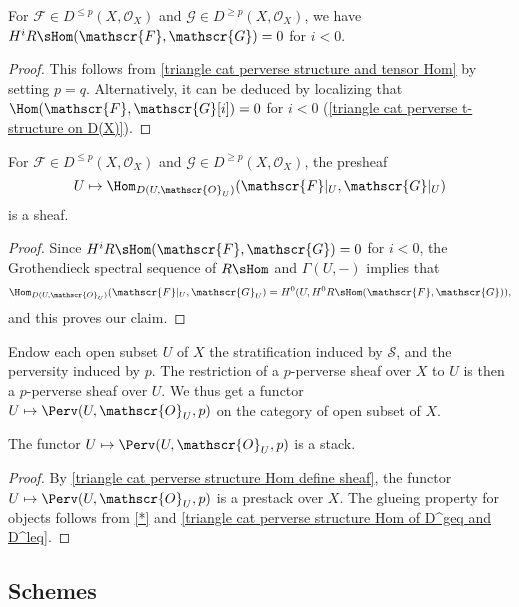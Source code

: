 \begin{corollary}\label{triangle cat perverse structure Hom of D^geq and D^leq}
For $\mathscr{F}\in D^{\leq p}(X,\mathscr{O}_X)$ and $\mathscr{G}\in D^{\geq p}(X,\mathscr{O}_X)$, we have $H^iR\sHom(\mathscr{F},\mathscr{G})=0$ for $i<0$.
\end{corollary}
\begin{proof}
This follows from \cref{triangle cat perverse structure and tensor Hom} by setting $p=q$. Alternatively, it can be deduced by localizing that $\Hom(\mathscr{F},\mathscr{G}[i])=0$ for $i<0$ (\cref{triangle cat perverse t-structure on D(X)}).
\end{proof}

\begin{corollary}\label{triangle cat perverse structure Hom define sheaf}
For $\mathscr{F}\in D^{\leq p}(X,\mathscr{O}_X)$ and $\mathscr{G}\in D^{\geq p}(X,\mathscr{O}_X)$, the presheaf
\[U\mapsto\Hom_{D(U,\mathscr{O}_U)}(\mathscr{F}|_U,\mathscr{G}|_U)\]
is a sheaf.
\end{corollary}
\begin{proof}
Since $H^iR\sHom(\mathscr{F},\mathscr{G})=0$ for $i<0$, the Grothendieck spectral sequence of $R\sHom$ and $\Gamma(U,-)$ implies that
\[\Hom_{D(U,\mathscr{O}_U)}(\mathscr{F}|_U,\mathscr{G}_U)=H^0(U,H^0R\sHom(\mathscr{F},\mathscr{G})),\]
and this proves our claim.
\end{proof}

Endow each open subset $U$ of $X$ the stratification induced by $\mathcal{S}$, and the perversity induced by $p$. The restriction of a $p$-perverse sheaf over $X$ to $U$ is then a $p$-perverse sheaf over $U$. We thus get a functor $U\mapsto\Perv(U,\mathscr{O}_U,p)$ on the category of open subset of $X$.
\begin{corollary}\label{triangle cat perverse sheaf is stack}
The functor $U\mapsto\Perv(U,\mathscr{O}_U,p)$ is a stack.
\end{corollary}
\begin{proof}
By \cref{triangle cat perverse structure Hom define sheaf}, the functor $U\mapsto\Perv(U,\mathscr{O}_U,p)$ is a prestack over $X$. The glueing property for objects follows from \cref{*} and \cref{triangle cat perverse structure Hom of D^geq and D^leq}.
\end{proof}

\subsection{Schemes}\label{triangle cat perverse sheaf scheme subsection}
